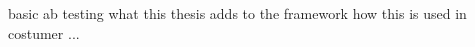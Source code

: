 \documentclass[main.tex]{subfiles}
\begin{document}
basic ab testing what this thesis adds to the framework how this is used in costumer ...
\end{document}

